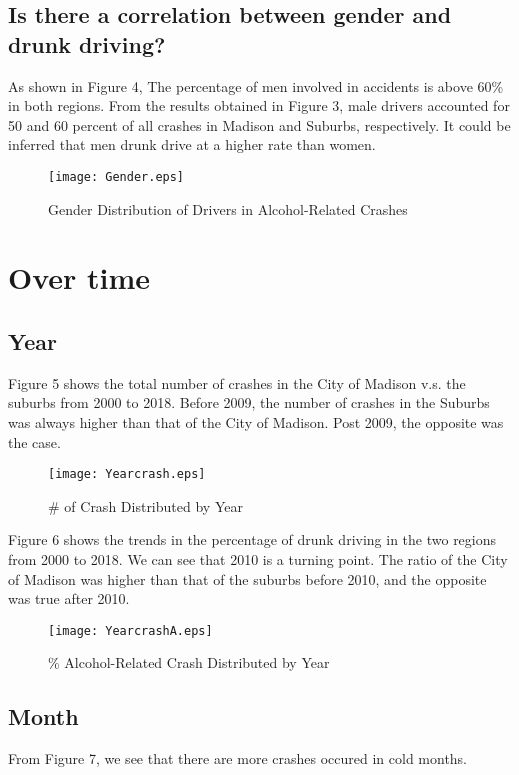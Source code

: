 \documentclass[10pt]{article}
\begin{document}
\newpage
\subsection{Is there a correlation between gender and drunk driving?}

As shown in Figure 4, The percentage of men involved in accidents is above 60\% in both regions. From the results obtained in Figure 3, male drivers accounted for 50 and 60 percent of all crashes in Madison and Suburbs, respectively. It could be inferred that men drunk drive at a higher rate than women.

\begin{figure}[H]
\flushleft
\texttt{[image: Gender.eps]}
\caption{Gender Distribution of Drivers in Alcohol-Related Crashes}
\label{4}
\end{figure}

\newpage
\section{Over time}
\subsection{Year}
Figure 5 shows the total number of crashes in the City of Madison v.s. the suburbs from 2000 to 2018. Before 2009, the number of crashes in the Suburbs was always higher than that of the City of Madison. Post 2009, the opposite was the case.

\begin{figure}[H]
\flushleft
\texttt{[image: Yearcrash.eps]}
\caption{\# of Crash Distributed by Year}
\label{5}
\end{figure}

\newpage
Figure 6 shows the trends in the percentage of drunk driving in the two regions from 2000 to 2018. We can see that 2010 is a turning point. The ratio of the City of Madison was higher than that of the suburbs before 2010, and the opposite was true after 2010.

\begin{figure}[H]
\flushleft
\texttt{[image: YearcrashA.eps]}
\caption{\% Alcohol-Related Crash Distributed by Year}
\label{6}
\end{figure}

\newpage
\subsection{Month}
From Figure 7, we see that there are more crashes occured in cold months.
\end{document}
